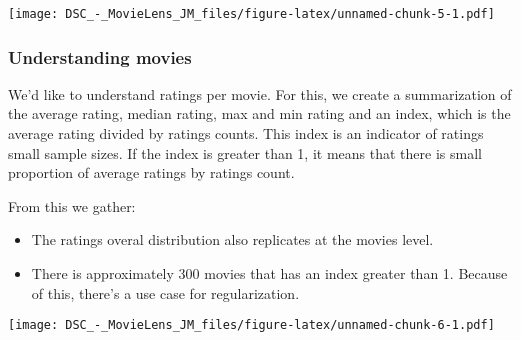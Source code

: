 \documentclass[]{article}
\newenvironment{Shaded}{\begin{snugshade}}{\end{snugshade}}
\newcommand{\KeywordTok}[1]{\textcolor[rgb]{0.13,0.29,0.53}{\textbf{#1}}}
\newcommand{\DataTypeTok}[1]{\textcolor[rgb]{0.13,0.29,0.53}{#1}}
\newcommand{\DecValTok}[1]{\textcolor[rgb]{0.00,0.00,0.81}{#1}}
\newcommand{\StringTok}[1]{\textcolor[rgb]{0.31,0.60,0.02}{#1}}
\newcommand{\OperatorTok}[1]{\textcolor[rgb]{0.81,0.36,0.00}{\textbf{#1}}}
\newcommand{\NormalTok}[1]{#1}
\providecommand{\tightlist}{%
  \setlength{\itemsep}{0pt}\setlength{\parskip}{0pt}}
\begin{document}
\texttt{[image: DSC\_-\_MovieLens\_JM\_files/figure-latex/unnamed-chunk-5-1.pdf]}

\subsubsection{Understanding movies}\label{understanding-movies}

We'd like to understand ratings per movie. For this, we create a
summarization of the average rating, median rating, max and min rating
and an index, which is the average rating divided by ratings counts.
This index is an indicator of ratings small sample sizes. If the index
is greater than 1, it means that there is small proportion of average
ratings by ratings count.

From this we gather:

\begin{itemize}
\tightlist
\item
  The ratings overal distribution also replicates at the movies level.
\item
  There is approximately 300 movies that has an index greater than 1.
  Because of this, there's a use case for regularization.
\end{itemize}

\begin{Shaded}
\end{Shaded}

\texttt{[image: DSC\_-\_MovieLens\_JM\_files/figure-latex/unnamed-chunk-6-1.pdf]}
\end{document}
